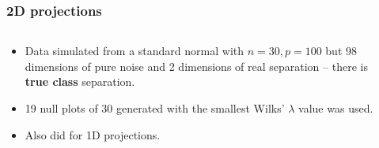 \documentclass{beamer}
\begin{document}
\begin{frame}
  \frametitle{ 2D projections}
	\begin{columns}
		\begin{column}{0.4\textwidth}
		  \begin{itemize}
			  \item Data simulated from a standard normal with $n=30, p=100$ but 98 dimensions of pure noise and 2 dimensions of real separation -- there is  {\bf true class} separation.
			\item 19 null plots of 30 generated with the smallest Wilks' $\lambda$ value was used. 
			\item Also did for 1D projections.
		  \end{itemize}		
			
		\end{column}
		
		\begin{column}{0.6\textwidth}
			 \begin{center}  \end{center}
		\end{column}
	\end{columns}  
\end{frame} 
\end{document}
